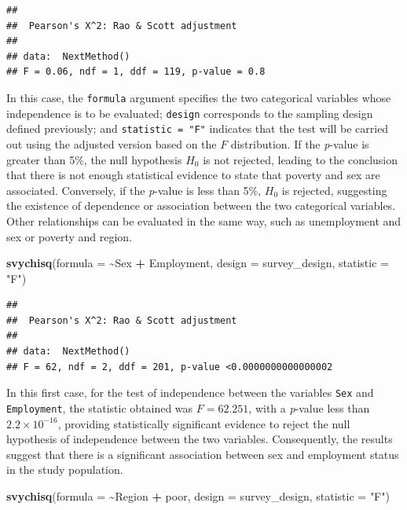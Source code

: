 \documentclass[
  english,
  12pt,
]{book}
\newenvironment{Shaded}{\begin{snugshade}}{\end{snugshade}}
\newcommand{\AttributeTok}[1]{\textcolor[rgb]{0.13,0.29,0.53}{#1}}
\newcommand{\FunctionTok}[1]{\textcolor[rgb]{0.13,0.29,0.53}{\textbf{#1}}}
\newcommand{\NormalTok}[1]{#1}
\newcommand{\SpecialCharTok}[1]{\textcolor[rgb]{0.81,0.36,0.00}{\textbf{#1}}}
\newcommand{\StringTok}[1]{\textcolor[rgb]{0.31,0.60,0.02}{#1}}
\begin{document}
\begin{verbatim}
## 
##  Pearson's X^2: Rao & Scott adjustment
## 
## data:  NextMethod()
## F = 0.06, ndf = 1, ddf = 119, p-value = 0.8
\end{verbatim}

In this case, the \texttt{formula} argument specifies the two categorical variables whose independence is to be evaluated; \texttt{design} corresponds to the sampling design defined previously; and \texttt{statistic\ =\ "F"} indicates that the test will be carried out using the adjusted version based on the \(F\) distribution. If the \emph{p}-value is greater than 5\%, the null hypothesis \(H_0\) is not rejected, leading to the conclusion that there is not enough statistical evidence to state that poverty and sex are associated. Conversely, if the \emph{p}-value is less than 5\%, \(H_0\) is rejected, suggesting the existence of dependence or association between the two categorical variables. Other relationships can be evaluated in the same way, such as unemployment and sex or poverty and region.

\begin{Shaded}
\begin{Highlighting}[]
\FunctionTok{svychisq}\NormalTok{(}\AttributeTok{formula =} \SpecialCharTok{\textasciitilde{}}\NormalTok{Sex }\SpecialCharTok{+}\NormalTok{ Employment, }\AttributeTok{design =}\NormalTok{ survey\_design, }\AttributeTok{statistic =} \StringTok{"F"}\NormalTok{)}
\end{Highlighting}
\end{Shaded}

\begin{verbatim}
## 
##  Pearson's X^2: Rao & Scott adjustment
## 
## data:  NextMethod()
## F = 62, ndf = 2, ddf = 201, p-value <0.0000000000000002
\end{verbatim}

In this first case, for the test of independence between the variables \texttt{Sex} and \texttt{Employment}, the statistic obtained was \(F = 62.251\), with a \emph{p}-value less than \(2.2\times10^{-16}\), providing statistically significant evidence to reject the null hypothesis of independence between the two variables. Consequently, the results suggest that there is a significant association between sex and employment status in the study population.

\begin{Shaded}
\begin{Highlighting}[]
\FunctionTok{svychisq}\NormalTok{(}\AttributeTok{formula =} \SpecialCharTok{\textasciitilde{}}\NormalTok{Region }\SpecialCharTok{+}\NormalTok{ poor, }\AttributeTok{design =}\NormalTok{ survey\_design, }\AttributeTok{statistic =} \StringTok{"F"}\NormalTok{)}
\end{Highlighting}
\end{Shaded}
\end{document}
